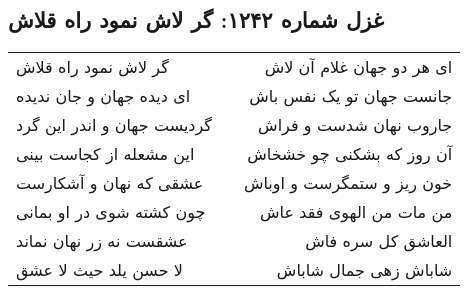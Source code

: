 \begin{center}
\section*{غزل شماره ۱۲۴۲: گر لاش نمود راه قلاش}
\label{sec:1242}
\begin{longtable}{l p{0.5cm} r}
گر لاش نمود راه قلاش
&&
ای هر دو جهان غلام آن لاش
\\
ای دیده جهان و جان ندیده
&&
جانست جهان تو یک نفس باش
\\
گردیست جهان و اندر این گرد
&&
جاروب نهان شدست و فراش
\\
این مشعله از کجاست بینی
&&
آن روز که بشکنی چو خشخاش
\\
عشقی که نهان و آشکارست
&&
خون ریز و ستمگرست و اوباش
\\
چون کشته شوی در او بمانی
&&
من مات من الهوی فقد عاش
\\
عشقست نه زر نهان نماند
&&
العاشق کل سره فاش
\\
لا حسن یلد حیث لا عشق
&&
شاباش زهی جمال شاباش
\\
\end{longtable}
\end{center}

